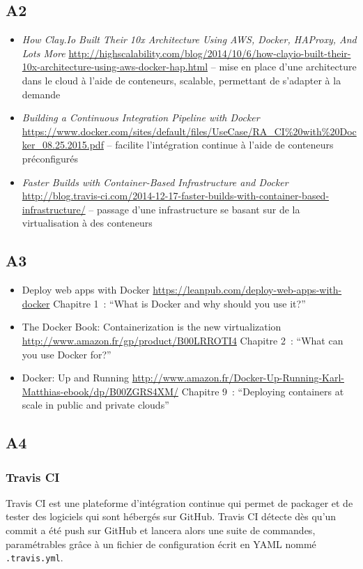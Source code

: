 \subsection{A2}
    \begin{itemize}
        \item \textit{How Clay.Io Built Their 10x Architecture Using AWS, Docker, HAProxy, And Lots More} \url{http://highscalability.com/blog/2014/10/6/how-clayio-built-their-10x-architecture-using-aws-docker-hap.html} -- mise en place d'une architecture dans le cloud à l'aide de conteneurs, scalable, permettant de s'adapter à la demande
        \item \textit{Building a Continuous Integration Pipeline with Docker} \url{https://www.docker.com/sites/default/files/UseCase/RA_CI%20with%20Docker_08.25.2015.pdf} -- facilite l'intégration continue à l'aide de conteneurs préconfigurés
        \item \textit{Faster Builds with Container-Based Infrastructure and Docker} \url{http://blog.travis-ci.com/2014-12-17-faster-builds-with-container-based-infrastructure/} -- passage d'une infrastructure se basant sur de la virtualisation à des conteneurs
    \end{itemize}

\subsection{A3}
    \begin{itemize}
        \item Deploy web apps with Docker \url{https://leanpub.com/deploy-web-apps-with-docker} Chapitre 1 : \enquote{What is Docker and why should you use it?}
        \item The Docker Book: Containerization is the new virtualization \url{http://www.amazon.fr/gp/product/B00LRROTI4} Chapitre 2 : \enquote{What can you use Docker for?}
        \item Docker: Up and Running \url{http://www.amazon.fr/Docker-Up-Running-Karl-Matthias-ebook/dp/B00ZGRS4XM/} Chapitre 9 : \enquote{Deploying containers at scale in public and private clouds}
    \end{itemize}

\subsection{A4}
    \subsubsection{Travis CI}
    Travis CI est une plateforme d'intégration continue qui permet de packager et de tester des logiciels qui sont hébergés sur GitHub. Travis CI détecte dès qu'un commit a été push sur GitHub et lancera alors une suite de commandes, paramétrables grâce à un fichier de configuration écrit en YAML nommé \texttt{.travis.yml}.\\

